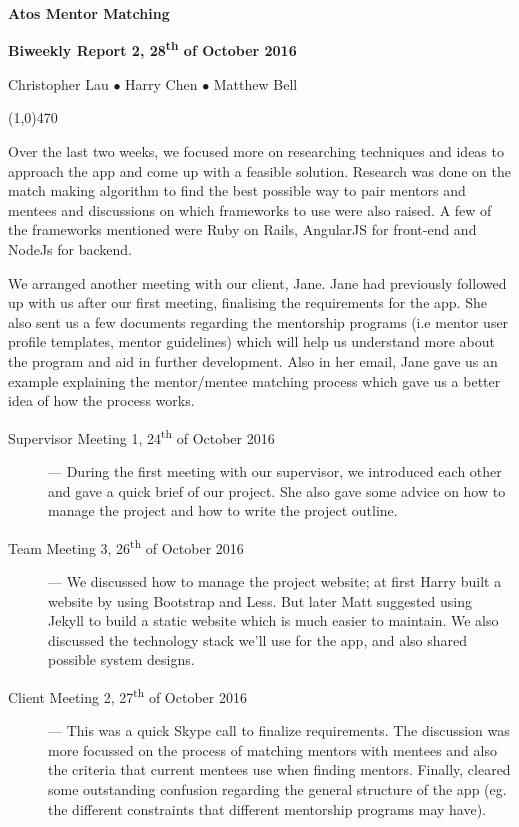 \documentclass[11pt]{report}
\begin{document}
\centerline{{\LARGE \bf Atos Mentor Matching}}

\centerline{ \large \bf Biweekly Report 2, 28\textsuperscript{th} of October 2016}
\centerline{ Christopher Lau $\bullet$ Harry Chen $\bullet$ Matthew Bell }
\noindent
\line(1,0){470}\\


\smallskip

\noindent
Over the last two weeks, we focused more on researching techniques and ideas to approach the app and come up with a feasible solution. Research was done on the match making algorithm to find the best possible way to pair mentors and mentees and discussions on which frameworks to use were also raised. A few of the frameworks mentioned were Ruby on Rails, AngularJS for front-end and NodeJs for backend.

We arranged another meeting with our client, Jane. Jane had previously followed up with us after our first meeting, finalising the requirements for the app. She also sent us a few documents regarding the mentorship programs (i.e mentor user profile templates, mentor guidelines) which will help us understand more about the program and aid in further development. Also in her email, Jane gave us an example explaining the mentor/mentee matching process which gave us a better idea of how the process works.

\bigskip
{}
\smallskip

\begin{description}
  \item[Supervisor Meeting 1, 24\textsuperscript{th} of October 2016] --- During the first meeting with our supervisor, we introduced each other and gave a quick brief of our project. She also gave some advice on how to manage the project and how to write the project outline.
  \item[Team Meeting 3, 26\textsuperscript{th} of October 2016] --- We discussed how to manage the project website; at first Harry built a website by using Bootstrap and Less. But later Matt suggested using Jekyll to build a static website which is much easier to maintain. We also discussed the technology stack we'll use for the app, and also shared possible system designs.
  \item[Client Meeting 2, 27\textsuperscript{th} of October 2016] --- This was a quick Skype call to finalize requirements. The discussion was more focussed on the process of matching mentors with mentees and also the criteria that current mentees use when finding mentors. Finally, cleared some outstanding confusion regarding the general structure of the app (eg. the different constraints that different mentorship programs may have).
\end{description}
\end{document}
